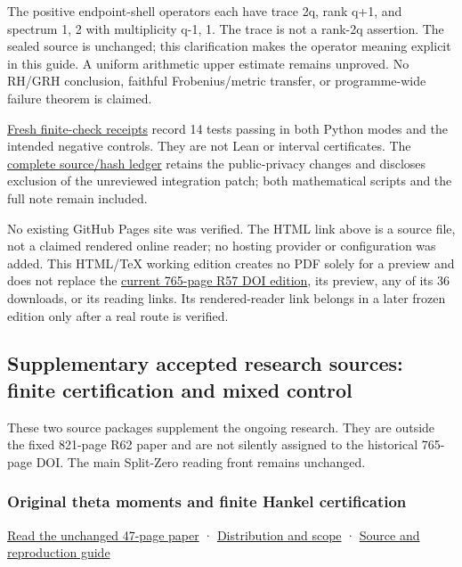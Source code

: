 \documentclass[
]{article}
\begin{document}
The positive endpoint-shell operators each have trace 2q, rank q+1, and
spectrum 1, 2 with multiplicity q-1, 1. The trace is not a rank-2q
assertion. The sealed source is unchanged; this clarification makes the
operator meaning explicit in this guide. A uniform arithmetic upper
estimate remains unproved. No RH/GRH conclusion, faithful
Frobenius/metric transfer, or programme-wide failure theorem is claimed.

\href{workbenches/tau-marked-product-four-endpoint/checks/PUBLIC_REPLAY.json}{Fresh
finite-check receipts} record 14 tests passing in both Python modes and
the intended negative controls. They are not Lean or interval
certificates. The
\href{workbenches/tau-marked-product-four-endpoint/PUBLIC_FILE_CHANGES.json}{complete
source/hash ledger} retains the public-privacy changes and discloses
exclusion of the unreviewed integration patch; both mathematical scripts
and the full note remain included.

No existing GitHub Pages site was verified. The HTML link above is a
source file, not a claimed rendered online reader; no hosting provider
or configuration was added. This HTML/TeX working edition creates no PDF
solely for a preview and does not replace the
\href{https://doi.org/10.5281/zenodo.22736292}{current 765-page R57 DOI
edition}, its preview, any of its 36 downloads, or its reading links.
Its rendered-reader link belongs in a later frozen edition only after a
real route is verified.

\subsection{Supplementary accepted research sources: finite
certification and mixed
control}\label{supplementary-accepted-research-sources-finite-certification-and-mixed-control}

These two source packages supplement the ongoing research. They are
outside the fixed 821-page R62 paper and are not silently assigned to
the historical 765-page DOI. The main Split-Zero reading front remains
unchanged.

\subsubsection{Original theta moments and finite Hankel
certification}\label{original-theta-moments-and-finite-hankel-certification}

\href{workbenches/splitzero-tandem/continuations/20260913-accepted-followups/original-theta-certification/Tau_Theta_Hankel_Complete_Proofs.pdf}{Read
the unchanged 47-page paper} ·
\href{workbenches/splitzero-tandem/continuations/20260913-accepted-followups/original-theta-certification/PUBLIC_DISTRIBUTION.md}{Distribution
and scope} ·
\href{workbenches/splitzero-tandem/continuations/20260913-accepted-followups/original-theta-certification/README.md}{Source
and reproduction guide}
\end{document}
